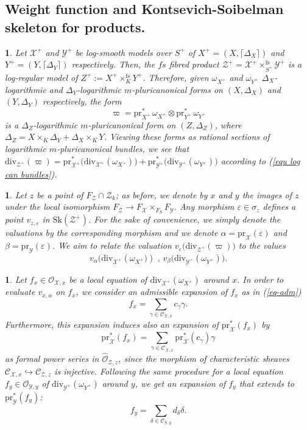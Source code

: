 \documentclass{amsart}%
\numberwithin{equation}{subsection}
\theoremstyle{plain2}
\theoremstyle{definition2}
\theoremstyle{stepstyle}
\theoremstyle{point}
\theoremstyle{subpoint}
\newtheorem{subpoint}[equation]{}%
\newcommand{\spa}[1]{\begin{subpoint}#1\end{subpoint}}           %
\newcommand{\cX}{\ensuremath{\mathscr{X}}}
\newcommand{\caC}{\ensuremath{\mathcal{C}}}
\newcommand{\caO}{\ensuremath{\mathcal{O}}}
\newcommand{\cY}{\ensuremath{\mathscr{Y}}}
\newcommand{\cZ}{\ensuremath{\mathscr{Z}}}
\renewcommand{\cY}{\ensuremath{\mathscr{Y}}}
\newcommand{\pr}{\mathrm{pr}}
\newcommand{\divisor}{\mathrm{div}}
\newcommand{\Sk}{\mathrm{Sk}}
\begin{document}
\subsection{Weight function and Kontsevich-Soibelman skeleton for products.} \label{paragraph weight function product}
\spa{Let $\cX^+$ and $\cY^+$ be log-smooth models over $S^+$ of $X^+=(X,\lceil\Delta_X\rceil)$ and $Y^+=(Y,\lceil\Delta_Y\rceil)$ respectively. Then, the $fs$ fibred product $\cZ^+=\cX^+  \times^{\text{fs}}_{S^+} \cY^+$ is a log-regular model of $Z^+:=X^+ \times^{\text{fs}}_K Y^+$. Therefore, given $\omega_{X^+}$ and $\omega_{Y^+}$ $\Delta_X$-logarithmic and $\Delta_Y$-logarithmic $m$-pluricanonical forms on $(X,\Delta_X)$ and $(Y,\Delta_Y)$ respectively, the form $$\varpi=\pr_{X^+}^* \,\omega_{X^+} \otimes \pr_{Y^+}^* \,\omega_{Y^+}$$ is a $\Delta_Z$-logarithmic $m$-pluricanonical form on $(Z,\Delta_Z)$, where $\Delta_Z= X \times_K \Delta_Y + \Delta_X \times_K Y$. Viewing these forms as rational sections of logarithmic $m$-pluricanonical bundles, we see that $\divisor_{\cZ^+}(\varpi)=\pr_{\cX^+}^* \big(\divisor_{\cX^+}(  \omega_{X^+})\big) +  \pr_{\cY^+}^* \big(\divisor_{\cY^+} (\omega_{Y^+})\big)$ according to (\ref{equ log can bundles}).}

\spa{Let $z$ be a point of $F_{\cZ} \cap \cZ_k$; as before, we denote by $x$ and $y$ the images of $z$ under the local isomorphism $F_{\cZ} \rightarrow F_{\cX} \times_{F_S} F_{\cY}$. Any morphism $\varepsilon \in \sigma_z$ defines a point $v_{z,\varepsilon}$ in $\Sk(\cZ^+)$. For the sake of convenience, we simply denote the valuations by the corresponding morphism and we denote $\alpha= \pr_{\cX}(\varepsilon)$ and $\beta=\pr_{\cY}(\varepsilon)$. We aim to relate the valuation $v_{\varepsilon}\big(\divisor_{\cZ^+}(\varpi)\big)$ to the values $$v_{\alpha}\big(\divisor_{\cX^+}(\omega_{X^+}\big)) \text{ , } v_{\beta}\big(\divisor_{\cY^+}(\omega_{Y^+})\big).$$}

\spa{Let $f_x \in \caO_{\cX,x}$ be a local equation of $\divisor_{\cX^+}(\omega_{X^+})$ around $x$. In order to evaluate $v_{x,\alpha}$ on $f_x$, we consider an admissible expansion of $f_x$ as in (\ref{eq-adm}) $$f_x=\sum_{\gamma\in \caC_{\cX,x}}c_\gamma \gamma.$$ Furthermore, this expansion induces also an expansion of $\pr_{\cX}^*(f_x)$ by  $$\pr_{\cX}^*(f_x)=\sum_{\gamma\in \caC_{\cX,x} }\pr^*_{\cX}(c_\gamma) \gamma$$ as formal power series in $\widehat{\caO}_{\cZ,z}$, since the morphism of characteristic sheaves $\mathcal{C}_{\cX,x} \hookrightarrow \mathcal{C}_{\cZ,z}$ is injective. Following the same procedure for a local equation $f_y \in \caO_{\cY,y}$ of $\divisor_{\cY^+}(\omega_{Y^+})$ around $y$, we get an expansion of $f_y$ that extends to $\pr_{\cY}^*(f_y)$: 
$$f_y=\sum_{\delta\in \caC_{\cY,y}}d_\delta \delta.$$}
\end{document}
